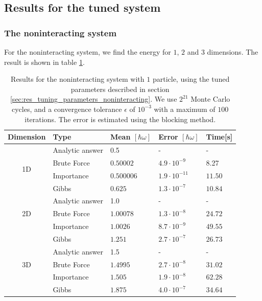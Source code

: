 \documentclass[a4paper, 10pt]{article}
\begin{document}
\subsection{Results for the tuned system}
\subsubsection{The noninteracting system}
For the noninteracting system, we find the energy for $1$, $2$ and $3$ dimensions. The result is shown in table \ref{tab:noninteracting_results}.
\begin{table}[ht!]
	\centering
	\caption{Results for the noninteracting system with $1$ particle, using the tuned parameters described in section \ref{sec:res_tuning_parameters_noninteracting}. We use $2^{21}$ Monte Carlo cycles, and a convergence tolerance $\epsilon$ of $10^{-3}$ with a maximum of $100$ iterations. The error is estimated using the blocking method.}
	\label{tab:noninteracting_results}
	\begin{tabular}{c|l|l|l|l|}
		\multicolumn{1}{l}{Dimension} & Type        & Mean $[\hbar \omega]$ & Error $[\hbar \omega]$ & Time{[}s{]} \\
		\hline
		\multirow{4}{*}{1D}       		&Analytic answer & 0.5&-&-\\    
		& Brute Force & $0.50002$               & $4.9\cdot 10^{-9}$     & 8.27        \\
		& Importance  & $0.500006$              & $1.9\cdot 10^{-11}$                  & $11.50$       \\
		& Gibbs       & $0.625$                 & $1.3\cdot 10^{-7}$                  & $10.84$       \\
		\hline
		\multirow{3}{*}{2D}   &Analytic answer & 1.0&- &-\\
		& Brute Force & $1.00078$               & $1.3\cdot 10^{-8}$                  & $24.72$       \\
		& Importance  & $1.0026$                & $8.7\cdot 10^{-9}$                  & $49.55$       \\
		& Gibbs       & $1.251$                 & $2.7\cdot 10^{-7}$                  & $26.73$       \\
		\hline
		\multirow{3}{*}{3D}   &Analytic answer & 1.5 & - & -\\
		         & Brute Force & $1.4995$                & $2.7\cdot 10^{-8}$                  & $31.02$       \\
		& Importance  & $1.505$                & $1.9\cdot 10^{-8}$                  & $62.28$       \\
		& Gibbs       & $1.875$                 & $4.0\cdot 10^{-7}$                  & $34.64$      
	\end{tabular}
\end{table}
\end{document}
